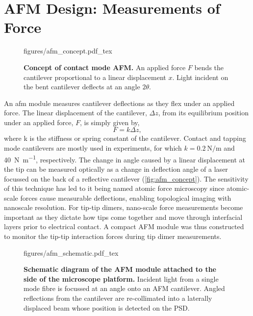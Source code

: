 \documentclass{article}
\begin{document}
\section{AFM Design: Measurements of Force}

\begin{wrapfigure}{O}{0.38\textwidth}
\centering
\vspace{-10pt}
\fontsize{10pt}{1em}\selectfont
\def\svgwidth{\textwidth}
{figures/afm_concept.pdf_tex}
\caption[Concept of contact mode AFM]{\textbf{Concept of contact mode AFM.} An applied force $F$ bends the cantilever proportional to a linear displacement $x$. Light incident on the bent cantilever deflects at an angle $2\theta$.}
\label{fig:afm_concept}
\vspace{-5pt}
\end{wrapfigure}

An \gls{afm} module measures cantilever deflections as they flex under an applied force. The linear displacement of the cantilever, $\Delta z$, from its equilibrium position under an applied force, $F$, is simply given by,
\begin{equation}
	F=k\Delta z, \label{eq:hookes_law}
\end{equation}
where \gls{k} is the stiffness or spring constant of the cantilever. Contact and tapping mode cantilevers are mostly used in experiments, for which $k=\SI{0.2}{\newton\per\metre}$ and \SI{40}{\newton\per\metre}, respectively. The change in angle caused by a linear displacement at the tip can be measured optically as a change in deflection angle of a laser focussed on the back of a reflective cantilever (\autoref{fig:afm_concept}). The sensitivity of this technique has led to it being named atomic force microscopy since atomic-scale forces cause measurable deflections, enabling topological imaging with nanoscale resolution. For tip-tip dimers, nano-scale force measurements become important as they dictate how tips come together and move through interfacial layers prior to electrical contact. A compact AFM module was thus constructed to monitor the tip-tip interaction forces during tip dimer measurements.

\begin{figure}[bt]
\centering
{\fontsize{9.5pt}{1em}\selectfont \def\svgwidth{0.8\textwidth} {figures/afm_schematic.pdf_tex}}
\caption[Schematic diagram of the AFM module.]{\textbf{Schematic diagram of the AFM module attached to the side of the microscope platform.} Incident light from a single mode fibre is focussed at an angle onto an AFM cantilever. Angled reflections from the cantilever are re-collimated into a laterally displaced beam whose position is detected on the PSD.}
\label{fig:afm_design}
\end{figure}
\end{document}
